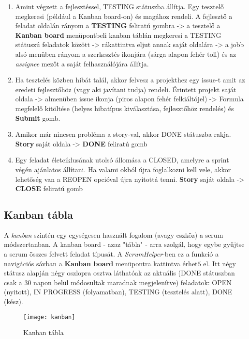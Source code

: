 \begin{enumerate}
	\item Amint végzett a fejlesztéssel, TESTING státuszba állítja. Egy tesztelő megkeresi (például a Kanban board-on) és magához rendeli. A fejlesztő a feladat oldalán rányom a \textbf{TESTING} feliratú gombra -> a tesztelő a \textbf{Kanban board} menüpontbeli kanban táblán megkeresi a TESTING státuszú feladatok között -> rákattintva eljut annak saját oldalára -> a jobb alsó menüben rányom a szerkesztés ikonjára (sárga alapon fehér toll) és az \textit{assignee} mezőt a saját felhasználójára állítja.
	\item Ha tesztelés közben hibát talál, akkor felvesz a projekthez egy issue-t amit az eredeti fejlesztőhöz (vagy aki javítani tudja) rendeli. Érintett projekt saját oldala -> almenüben issue ikonja (piros alapon fehér felkiáltójel) -> Formula megfelelő kitöltése (helyes hibatípus kiválasztása, fejlesztőhöz rendelés) és \textbf{Submit} gomb.
	\item Amikor már nincsen probléma a story-val, akkor DONE státuszba rakja. \textbf{Story} saját oldala -> \textbf{DONE} feliratú gomb
	\item Egy feladat életciklusának utolsó állomása a CLOSED, amelyre a sprint végén ajánlatos állítani. Ha valami okból újra foglalkozni kell vele, akkor lehetőség van a REOPEN opcióval újra nyitottá tenni. \textbf{Story} saját oldala -> \textbf{CLOSE} feliratú gomb
\end{enumerate}

\subsection{Kanban tábla}
\label{kanbanboard}

A \textit{kanban} szintén egy egységesen használt fogalom (avagy eszköz) a scrum módszertanban. A kanban board - azaz "tábla" - arra szolgál, hogy egybe gyűjtse a scrum összes felvett feladat típusát. A \textit{ScrumHelper}-ben ez a funkció a navigációs sávban a \textbf{Kanban board} menüpontra kattintva érhető el. Itt négy státusz alapján négy oszlopra osztva láthatóak az aktuális (DONE státuszban csak a 30 napon belül módosultak maradnak megjelenítve) feladatok: OPEN (nyitott), IN PROGRESS (folyamatban), TESTING (tesztelés alatt), DONE (kész).

\begin{figure}[H]
	\centering
	\texttt{[image: kanban]}
	\caption{Kanban tábla}
	\label{fig:kanban}
\end{figure}

